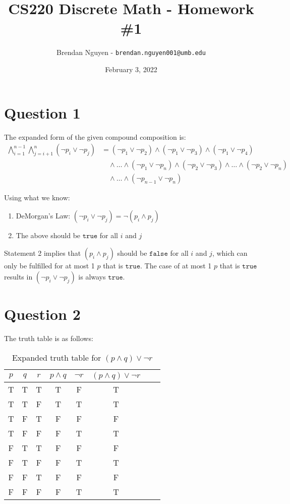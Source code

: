 \documentclass[letterpaper, 12pt]{article}
\title{CS220 Discrete Math - Homework \#1}
\author{Brendan Nguyen - \texttt{brendan.nguyen001@umb.edu}}
\date{February 3, 2022}
\begin{document}
\maketitle

\section*{Question 1}
The expanded form of the given compound composition is:
\[
    \begin{split}
        \bigwedge_{i=1}^{n-1} \bigwedge_{j=i+1}^n (\neg p_i \lor \neg p_j) &= (\neg p_1 \lor \neg p_2) \land (\neg p_1 \lor \neg p_3) \land (\neg p_1 \lor \neg p_4)\\
        &\quad\land \ldots \land (\neg p_1 \lor \neg p_n) \land (\neg p_2 \lor \neg p_3) \land \ldots \land (\neg p_2 \lor \neg p_n)\\
        &\quad\land \ldots \land (\neg p_{n-1} \lor \neg p_n)
    \end{split}
\]
	
Using what we know:

\begin{enumerate}
  \item DeMorgan's Law: $(\neg p_i \lor \neg p_j) = \neg (p_i \land p_j)$
  \item The above should be $\texttt{true}$ for all $i$ and $j$
\end{enumerate}

Statement 2 implies that $(p_i \land p_j)$ should be $\texttt{false}$ for all $i$ and $j$, which can only be fulfilled for at most 1 $p$ that is $\texttt{true}$. The case of at most 1 $p$ that is $\texttt{true}$ results in $(\neg p_i \lor \neg p_j)$ is always $\texttt{true}$.

\section*{Question 2}

The truth table is as follows:
\begin{table}[H]
\centering
    \begin{tabular}{|c c c|c|c|c|c|c|}
    \hline
    $p$ & $q$ & $r$ & $p \land q$ & $\neg r$ & $(p \land q) \lor \neg r$ \\ \hline
    T & T & T & T & F & T\\ \hline
    T & T & F & T & T & T\\ \hline
    T & F & T & F & F & F\\ \hline
    T & F & F & F & T & T\\ \hline
    F & T & T & F & F & F\\ \hline
    F & T & F & F & T & T\\ \hline
    F & F & T & F & F & F\\ \hline
    F & F & F & F & T & T\\ \hline
    \end{tabular}
    \caption{Expanded truth table for $(p \land q) \lor \neg r$}
    \label{table:1}
\end{table}
\end{document}
